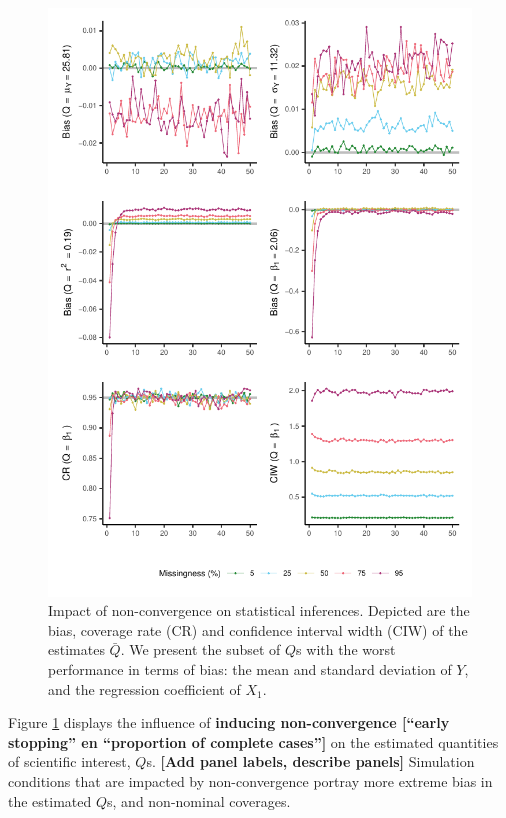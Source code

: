 \documentclass[Royal,times,sageh]{sagej}
\begin{document}
\begin{figure}

{\centering \includegraphics{2.Manuscript_files/figure-latex/Qs-1} 

}

\caption{Impact of non-convergence on statistical inferences. Depicted are the bias, coverage rate (CR) and confidence interval width (CIW) of the estimates $\bar{Q}$. We present the subset of $Q$s with the worst performance in terms of bias: the mean and standard deviation of $Y$, and the regression coefficient of $X_1$.}\label{fig:Qs}
\end{figure}

Figure \ref{fig:Qs} displays the influence of \textbf{inducing non-convergence {[}``early stopping'' en ``proportion of complete cases''{]}} on the estimated quantities of scientific interest, \(Q\)s. \textbf{{[}Add panel labels, describe panels{]}} Simulation conditions that are impacted by non-convergence portray more extreme bias in the estimated \(Q\)s, and non-nominal coverages.
\end{document}
